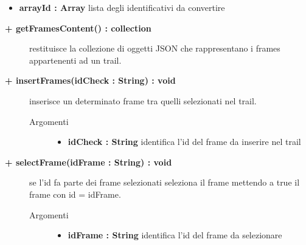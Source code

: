 \begin{description}
\begin{description}
\begin{description}
\begin{itemize}
					\item \textbf{arrayId : Array			} \hfill
						lista degli identificativi da convertire
					
				\end{itemize}
		\end{description}
	\end{description}
	
	\begin{description}
		\item[\textbf{\color{blue}+ getFramesContent() : collection			}] \hfill
			restituisce la collezione di oggetti JSON che rappresentano i frames appartenenti ad un trail.
			
	\end{description}
	
	\begin{description}
		\item[\textbf{\color{blue}+ insertFrames(idCheck : String) : void			}] \hfill
			inserisce un determinato frame tra quelli selezionati nel trail.
			
		\begin{description}
			\item[Argomenti] \hfill
				\begin{itemize}
				
					\item \textbf{idCheck : String			} \hfill
						identifica l'id del frame da inserire nel trail
					
				\end{itemize}
		\end{description}
	\end{description}
	
	\begin{description}
		\item[\textbf{\color{blue}+ selectFrame(idFrame : String) : void			}] \hfill
			se l'id fa parte dei frame selezionati seleziona il frame mettendo a true il frame con id = idFrame.
			
		\begin{description}
			\item[Argomenti] \hfill
				\begin{itemize}
				
					\item \textbf{idFrame : String			} \hfill
						identifica l'id del frame da selezionare
					

\end{itemize}
\end{description}
\end{description}
\end{description}
